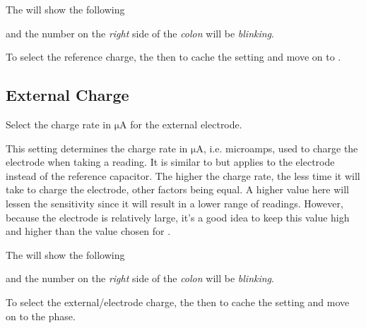 The  will show the following


and the number on the \textit{right} side of the \textit{colon} will be
\textit{blinking}.

\par\medskip

To select the reference charge,  the  then  to cache the
setting and move on to .


\subsection{External Charge} 

Select the charge rate in $\mathrm{\mu A}$ for the external electrode.

\par\medskip

This setting determines the charge rate in $\mathrm{\mu A}$, i.e. microamps,
used to charge the electrode when taking a reading.  It is similar to 
but applies to the electrode instead of the reference capacitor.  The higher
the charge rate, the less time it will take to charge the electrode, other
factors being equal.  A higher value here will lessen the sensitivity since it
will result in a lower range of readings.  However, because the electrode is
relatively large, it's a good idea to keep this value high and higher than the
value chosen for .

\par\medskip

The  will show the following


and the number on the \textit{right} side of the \textit{colon} will be
\textit{blinking}.

\par\medskip

To select the external\slash electrode charge,  the  then 
to cache the setting and move on to the \hyperref[Touch Calibration]{}
phase.

